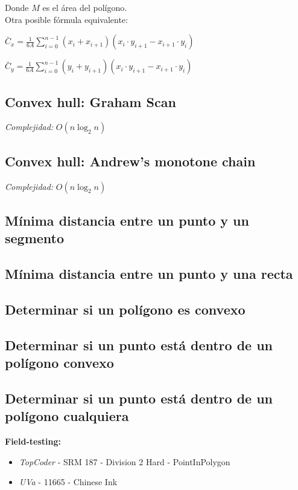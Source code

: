 \documentclass[10pt,letterpaper,twocolumn]{article}
\newcommand{\codigofuente}[1]{

\dotfill
}
\begin{document}
\medskip

Donde $ M $ es el área del polígono. \\

Otra posible fórmula equivalente:

$ \displaystyle\bar{C}_{x} = \frac{1}{6A} \sum_{i=0}^{n-1} (x_{i} + x_{i+1}) (x_{i} \cdot y_{i+1} - x_{i+1} \cdot y_{i}) $

\medskip

$ \displaystyle\bar{C}_{y} = \frac{1}{6A} \sum_{i=0}^{n-1} (y_{i} + y_{i+1}) (x_{i} \cdot y_{i+1} - x_{i+1} \cdot y_{i}) $


\subsection{Convex hull: Graham Scan}
\emph{Complejidad:} $ O(n \log_{2}{n}) $
\codigofuente{./src/geometria/grahamscan.cpp}

\subsection{Convex hull: Andrew's monotone chain}
\emph{Complejidad:} $ O(n \log_{2}{n}) $
\codigofuente{./src/geometria/monotonechain.cpp}

\subsection{Mínima distancia entre un punto y un segmento}
\codigofuente{./src/geometria/distance_point_to_segment.cpp}

\subsection{Mínima distancia entre un punto y una recta}
\codigofuente{./src/geometria/distance_point_to_line.cpp}

\subsection{Determinar si un polígono es convexo}
\codigofuente{./src/geometria/is_convex_polygon.cpp}

\subsection{Determinar si un punto está dentro de un polígono convexo}
\codigofuente{./src/geometria/is_inside_convex_polygon.cpp}

\subsection{Determinar si un punto está dentro de un polígono cualquiera}
\small
\textbf{Field-testing:}
\begin{itemize}
\item \emph{TopCoder} -  SRM 187 - Division 2 Hard - PointInPolygon
\item \emph{UVa} - 11665 - Chinese Ink
\end{itemize}
\normalsize
\codigofuente{./src/geometria/is_inside_concave_polygon.cpp}
\end{document}
